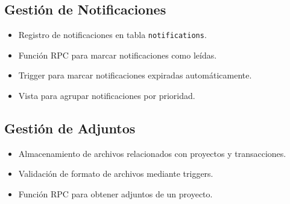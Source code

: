 \subsection{Gestión de Notificaciones}
\begin{itemize}
    \item Registro de notificaciones en tabla \texttt{notifications}.
    \item Función RPC para marcar notificaciones como leídas.
    \item Trigger para marcar notificaciones expiradas automáticamente.
    \item Vista para agrupar notificaciones por prioridad.
\end{itemize}

\subsection{Gestión de Adjuntos}
\begin{itemize}
    \item Almacenamiento de archivos relacionados con proyectos y transacciones.
    \item Validación de formato de archivos mediante triggers.
    \item Función RPC para obtener adjuntos de un proyecto.
\end{itemize}